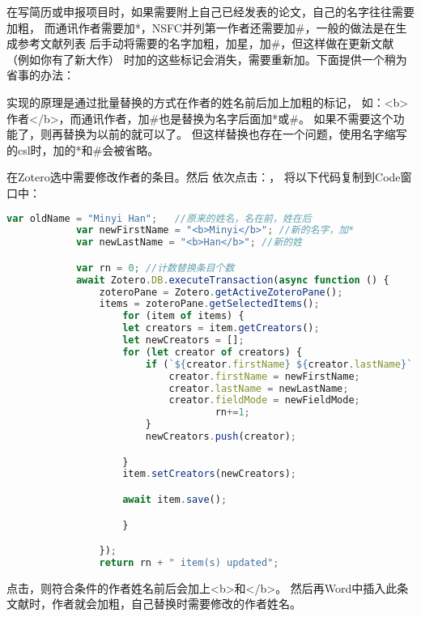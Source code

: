 \documentclass[cn,11pt,chinese]{elegantbook}
\begin{document}
		在写简历或申报项目时，如果需要附上自己已经发表的论文，自己的名字往往需要加粗，
		而通讯作者需要加*，NSFC并列第一作者还需要加\#，一般的做法是在生成参考文献列表
		后手动将需要的名字加粗，加星，加\#，但这样做在更新文献（例如你有了新大作）
		时加的这些标记会消失，需要重新加。下面提供一个稍为省事的办法：

		实现的原理是通过批量替换的方式在作者的姓名前后加上加粗的标记，
		如：<b>作者</b>，而通讯作者，加\#也是替换为名字后面加*或\#。
		如果不需要这个功能了，则再替换为以前的就可以了。
		但这样替换也存在一个问题，使用名字缩写的csl时，加的*和\#会被省略。

		在Zotero选中需要修改作者的条目。然后
		依次点击：，
		将以下代码复制到Code窗口中：

		\begin{lstlisting}[language=JavaScript]
			var oldName = "Minyi Han";   //原来的姓名，名在前，姓在后
			var newFirstName = "<b>Minyi</b>"; //新的名字，加*
			var newLastName = "<b>Han</b>"; //新的姓

			var rn = 0; //计数替换条目个数
			await Zotero.DB.executeTransaction(async function () {
				zoteroPane = Zotero.getActiveZoteroPane();
				items = zoteroPane.getSelectedItems();
					for (item of items) {
					let creators = item.getCreators();
					let newCreators = [];
					for (let creator of creators) {
						if (`${creator.firstName} ${creator.lastName}`.trim() == oldName) {
							creator.firstName = newFirstName;
							creator.lastName = newLastName;
							creator.fieldMode = newFieldMode;
									rn+=1;
						}
						newCreators.push(creator);

					}
					item.setCreators(newCreators);

					await item.save();

					}

				}); 
				return rn + " item(s) updated";
				\end{lstlisting}
			点击，则符合条件的作者姓名前后会加上<b>和</b>。
			然后再Word中插入此条文献时，作者就会加粗，自己替换时需要修改的作者姓名。
\end{document}
